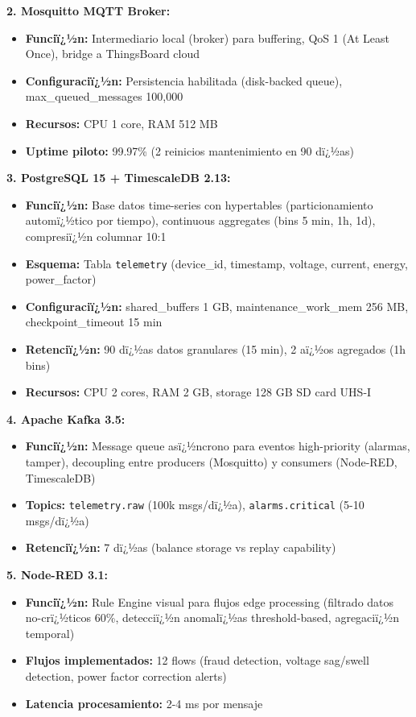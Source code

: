 \textbf{2. Mosquitto MQTT Broker:}
\begin{itemize}
    \item \textbf{Funciï¿½n:} Intermediario local (broker) para buffering, QoS 1 (At Least Once), bridge a ThingsBoard cloud
    \item \textbf{Configuraciï¿½n:} Persistencia habilitada (disk-backed queue), max\_queued\_messages 100,000
    \item \textbf{Recursos:} CPU 1 core, RAM 512 MB
    \item \textbf{Uptime piloto:} 99.97\% (2 reinicios mantenimiento en 90 dï¿½as)
\end{itemize}

\textbf{3. PostgreSQL 15 + TimescaleDB 2.13:}
\begin{itemize}
    \item \textbf{Funciï¿½n:} Base datos time-series con hypertables (particionamiento automï¿½tico por tiempo), continuous aggregates (bins 5 min, 1h, 1d), compresiï¿½n columnar 10:1
    \item \textbf{Esquema:} Tabla \texttt{telemetry} (device\_id, timestamp, voltage, current, energy, power\_factor)
    \item \textbf{Configuraciï¿½n:} shared\_buffers 1 GB, maintenance\_work\_mem 256 MB, checkpoint\_timeout 15 min
    \item \textbf{Retenciï¿½n:} 90 dï¿½as datos granulares (15 min), 2 aï¿½os agregados (1h bins)
    \item \textbf{Recursos:} CPU 2 cores, RAM 2 GB, storage 128 GB SD card UHS-I
\end{itemize}

\textbf{4. Apache Kafka 3.5:}
\begin{itemize}
    \item \textbf{Funciï¿½n:} Message queue asï¿½ncrono para eventos high-priority (alarmas, tamper), decoupling entre producers (Mosquitto) y consumers (Node-RED, TimescaleDB)
    \item \textbf{Topics:} \texttt{telemetry.raw} (100k msgs/dï¿½a), \texttt{alarms.critical} (5-10 msgs/dï¿½a)
    \item \textbf{Retenciï¿½n:} 7 dï¿½as (balance storage vs replay capability)
\end{itemize}

\textbf{5. Node-RED 3.1:}
\begin{itemize}
    \item \textbf{Funciï¿½n:} Rule Engine visual para flujos edge processing (filtrado datos no-crï¿½ticos 60\%, detecciï¿½n anomalï¿½as threshold-based, agregaciï¿½n temporal)
    \item \textbf{Flujos implementados:} 12 flows (fraud detection, voltage sag/swell detection, power factor correction alerts)
    \item \textbf{Latencia procesamiento:} 2-4 ms por mensaje
\end{itemize}

